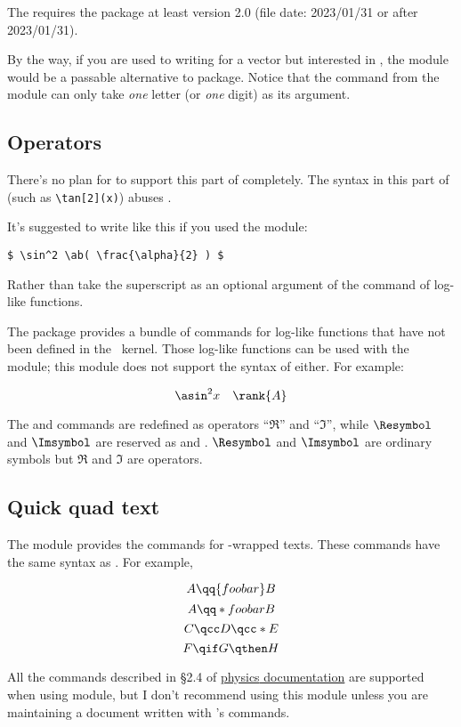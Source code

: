 \documentclass[11pt,letterpaper]{article}
\begin{document}
The  requires the  package at least
version 2.0 (file date: 2023/01/31 or after 2023/01/31).

By the way, if you are used to writing  for a vector but interested in
, the  module would be a passable
alternative to  package. Notice that the  command from the
 module can only take \emph{one} letter (or \emph{one} digit)
as its argument.

\subsection{Operators}
There's no plan for  to support this part of 
completely. The syntax in this part of  (such as \verb|\tan[2](x)|)
abuses .

It's suggested to write like this if you used the  module:
\begin{Verbatim}[fontsize=\small]
$ \sin^2 \ab( \frac{\alpha}{2} ) $
\end{Verbatim}
Rather than take the superscript as an optional argument of the command of
log-like functions.

The  package provides a bundle of commands for log-like functions
that have not been defined in the \LaTeXe\ kernel. Those log-like functions
can be used with the  module; this module does not support
the syntax of  either. For example:
\begin{example}
\[ \asin^2 x \quad \rank \{ A \} \]
\end{example}
The  and  commands are redefined as operators ``$\Re$'' and
``$\Im$'', while $\Resymbol$ and $\Imsymbol$ are reserved as  and
. $\Resymbol$ and $\Imsymbol$ are ordinary symbols but $\Re$ and
$\Im$ are operators.

\subsection{Quick quad text}\label{subsec:qtext}
The  module provides the  commands
for -wrapped texts. These commands have the same syntax as
. For example,
\begin{example}
\[ A \qq {foo bar} B \]
\[ A \qq*{foo bar} B \]
\[ C \qcc D \qcc*  E \]
\[ F \qif G \qthen H \]
\end{example}
All the commands described in \S2.4 of
\hyperref{http://mirrors.ctan.org/macros/latex/contrib/physics/physics.pdf}{}{}%
{\textsf{physics} documentation} are supported when using 
module, but I don't recommend using this module unless you are maintaining a
document written with 's  commands.
\end{document}
